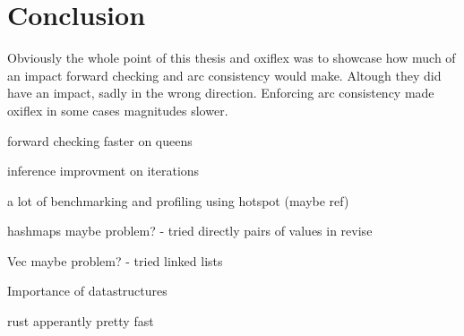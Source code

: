 
\chapter{Conclusion}

Obviously the whole point of this thesis and oxiflex was to showcase how much of an impact forward checking and arc consistency would make. Altough they did have an impact, sadly in the wrong direction. Enforcing arc consistency made oxiflex in some cases magnitudes slower.

forward checking faster on queens

inference improvment on iterations

a lot of benchmarking and profiling using hotspot (maybe ref)

hashmaps maybe problem?
- tried directly pairs of values in revise

Vec maybe problem?
- tried linked lists

Importance of datastructures

rust apperantly pretty fast
